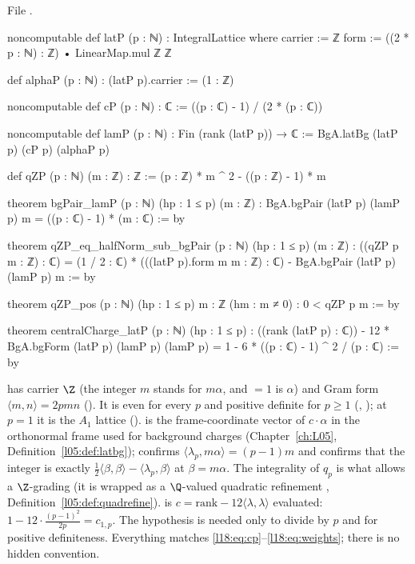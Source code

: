 \noindent File .
\begin{leancode}
noncomputable def latP (p : ℕ) : IntegralLattice where
  carrier := ℤ
  form := ((2 * p : ℕ) : ℤ) • LinearMap.mul ℤ ℤ

def alphaP (p : ℕ) : (latP p).carrier := (1 : ℤ)

noncomputable def cP (p : ℕ) : ℂ := ((p : ℂ) - 1) / (2 * (p : ℂ))

noncomputable def lamP (p : ℕ) : Fin (rank (latP p)) → ℂ :=
  BgA.latBg (latP p) (cP p) (alphaP p)

def qZP (p : ℕ) (m : ℤ) : ℤ := (p : ℤ) * m ^ 2 - ((p : ℤ) - 1) * m
\end{leancode}
\begin{leancode}
theorem bgPair_lamP (p : ℕ) (hp : 1 ≤ p) (m : ℤ) :
    BgA.bgPair (latP p) (lamP p) m = ((p : ℂ) - 1) * (m : ℂ) := by

theorem qZP_eq_halfNorm_sub_bgPair (p : ℕ) (hp : 1 ≤ p) (m : ℤ) :
    ((qZP p m : ℤ) : ℂ)
      = (1 / 2 : ℂ) * (((latP p).form m m : ℤ) : ℂ) - BgA.bgPair (latP p) (lamP p) m := by

theorem qZP_pos (p : ℕ) (hp : 1 ≤ p) {m : ℤ} (hm : m ≠ 0) : 0 < qZP p m := by

theorem centralCharge_latP (p : ℕ) (hp : 1 ≤ p) :
    ((rank (latP p) : ℂ)) - 12 * BgA.bgForm (latP p) (lamP p) (lamP p)
      = 1 - 6 * ((p : ℂ) - 1) ^ 2 / (p : ℂ) := by
\end{leancode}
\begin{dictionary}
 has carrier $\Z$ (the integer $m$ stands for $m\alpha$, and  $=1$ is
$\alpha$) and Gram form $\langle m,n\rangle=2pmn$ (). It is even for every $p$ and
positive definite for $p\ge1$ (, ); at $p=1$ it is the $A_1$
lattice ().  is the frame-coordinate vector of $c\cdot\alpha$
in the orthonormal frame used for background charges (Chapter~\ref{ch:L05},
Definition~\ref{l05:def:latbg});  confirms $\langle\lambda_p,m\alpha\rangle=(p-1)m$
and  confirms that the integer  is exactly
$\frac12\langle\beta,\beta\rangle-\langle\lambda_p,\beta\rangle$ at $\beta=m\alpha$. The integrality of
$q_p$ is what allows a $\Z$-grading (it is wrapped as a $\Q$-valued quadratic refinement
, Definition~\ref{l05:def:quadrefine}).  is $c=\mathrm{rank}-12\langle\lambda,\lambda\rangle$
evaluated: $1-12\cdot\frac{(p-1)^2}{2p}=c_{1,p}$. The hypothesis  is needed only to
divide by $p$ and for positive definiteness. Everything matches
\eqref{l18:eq:cp}--\eqref{l18:eq:weights}; there is no hidden convention.
\end{dictionary}
